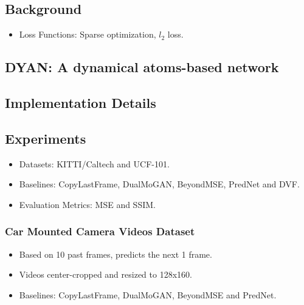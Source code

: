 \documentclass{article}
\begin{document}
    \subsection{Background}\label{subsec:DYAN_A_Dynamical_Atoms_Based_Network_For_Video_Prediction:background}
    \begin{itemize}
        \item Loss Functions: Sparse optimization, $l_2$ loss.
    \end{itemize}

    \subsection{DYAN: A dynamical atoms-based network}\label{subsec:DYAN_A_Dynamical_Atoms_Based_Network_For_Video_Prediction:dyan}

    \subsection{Implementation Details}\label{subsec:DYAN_A_Dynamical_Atoms_Based_Network_For_Video_Prediction:implementation}

    \subsection{Experiments}\label{subsec:DYAN_A_Dynamical_Atoms_Based_Network_For_Video_Prediction:experiments}
    \begin{itemize}
        \item Datasets: KITTI/Caltech and UCF-101.
        \item Baselines: CopyLastFrame, DualMoGAN, BeyondMSE, PredNet and DVF\@.
        \item Evaluation Metrics: MSE and SSIM\@.
    \end{itemize}

    \subsubsection{Car Mounted Camera Videos Dataset}\label{subsubsec:DYAN_A_Dynamical_Atoms_Based_Network_For_Video_Prediction:kitti-dataset}
    \begin{itemize}
        \item Based on 10 past frames, predicts the next 1 frame.
        \item Videos center-cropped and resized to 128x160.
        \item Baselines: CopyLastFrame, DualMoGAN, BeyondMSE and PredNet.
    \end{itemize}
\end{document}
